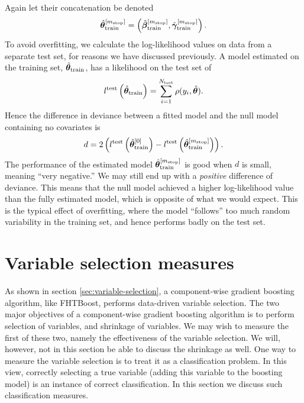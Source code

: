 Again let their concatenation be denoted
\begin{equation*}
    \hat{\boldsymbol{\theta}}^{[m_{\text{stop}}]}_{\text{train}}=\left(\hat{\boldsymbol{\beta}}^{[m_{\text{stop}}]}_{\text{train}},\hat{\boldsymbol{\gamma}}^{[m_{\text{stop}}]}_{\text{train}}\right).
\end{equation*}
To avoid overfitting, we calculate the log-likelihood values on data from a separate test set, for reasons we have discussed previously.
A model estimated on the training set, $\hat{\boldsymbol{\theta}}_{\text{train}}$, has a likelihood on the test set of
\begin{equation}
    l^{\text{test}}\left(\hat{\boldsymbol{\theta}}_{\text{train}}\right)=\sum_{i=1}^{N_{\text{test}}}\rho(y_i, \hat{\boldsymbol{\theta}}).
\end{equation}
Hence the difference in deviance between a fitted model and the null model containing no covariates is
\begin{equation*}
    d=2\left(l^{\text{test}}\left(\hat{\boldsymbol{\theta}}^{[0]}_{\text{train}}\right)-l^{\text{test}}\left(\hat{\boldsymbol{\theta}}^{[m_{\text{stop}}]}_{\text{train}}\right)\right).
\end{equation*}
The performance of the estimated model $\hat{\boldsymbol{\theta}}^{[m_{\text{stop}}]}_{\text{train}}$ is good when $d$ is small, meaning ``very negative.''
We may still end up with a \textit{positive} difference of deviance.
This means that the null model achieved a higher log-likelihood value than the fully estimated model, which is opposite of what we would expect.
This is the typical effect of overfitting, where the model ``follows'' too much random variability in the training set, and hence performs badly on the test set.


\section{Variable selection measures}
As shown in section \ref{sec:variable-selection}, a component-wise gradient boosting algorithm, like FHTBoost, performs data-driven variable selection.
The two major objectives of a component-wise gradient boosting algorithm is to perform selection of variables, and shrinkage of variables.
We may wish to measure the first of these two, namely the effectiveness of the variable selection.
We will, however, not in this section be able to discuss the shrinkage as well.
One way to measure the variable selection is to treat it as a classification problem.
In this view, correctly selecting a true variable (adding this variable to the boosting model) is an instance of correct classification.
In this section we discuss such classification measures.


